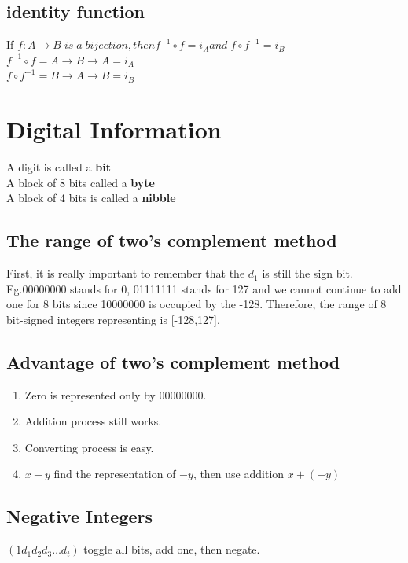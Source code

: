 \documentclass{article}
\begin{document}
\begin{spacing}{1.5}
\subsection{identity function}

If $f:A \rightarrow  B\; is\; a \;bijection, then f^{-1} \circ f = i_A and \;
f \circ f^{-1} = i_B$\\
$f^{-1} \circ f = A \rightarrow B \rightarrow A = i_A$\\
$f \circ f^{-1} = B \rightarrow A \rightarrow B = i_B$


\section{Digital Information}
A digit is called a \textbf{bit}\\
A block of 8 bits called a \textbf{byte}\\
A block of 4 bits is called a \textbf{nibble}
\subsection{The range of two's complement method}
First, it is really important to remember that the $d_1$ is still the sign bit.\\ 
Eg.00000000 stands for 0, 01111111 stands for 127 and we cannot continue to add one for 8 bits since 10000000 is occupied by the -128. Therefore, the range of 8 bit-signed integers representing is [-128,127].
\subsection{Advantage of two's complement method}
\begin{enumerate}
    \item Zero is represented only by 00000000.
    \item Addition process still works.
    \item Converting process is easy. 
    \item $x-y$ find the representation of $-y$, then use addition $x + (-y)$
\end{enumerate}

\subsection{Negative Integers}
$(1 d_ 1 d_2 d_3 \dots d_t)$ toggle all bits, add one, then negate.


\end{spacing}
\end{document}
